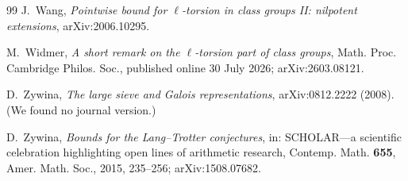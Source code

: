 \documentclass[11pt]{amsart}
\theoremstyle{definition}
\theoremstyle{remark}
\begin{document}
\begin{thebibliography}{99}
J.~Wang, \emph{Pointwise bound for $\ell$-torsion in class groups II: nilpotent extensions}, arXiv:2006.10295.

M.~Widmer, \emph{A short remark on the $\ell$-torsion part of class groups}, Math. Proc. Cambridge Philos. Soc.,
published online 30 July 2026; arXiv:2603.08121.

D.~Zywina, \emph{The large sieve and Galois representations}, arXiv:0812.2222 (2008). (We found no journal version.)

D.~Zywina, \emph{Bounds for the Lang--Trotter conjectures}, in: SCHOLAR---a scientific celebration highlighting open
lines of arithmetic research, Contemp. Math. \textbf{655}, Amer. Math. Soc., 2015, 235--256; arXiv:1508.07682.

\end{thebibliography}
\end{document}
